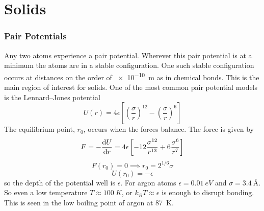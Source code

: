 %
%
%
%
%
%
    
    \part{Solids}
    \section{Pair Potentials}
    Any two atoms experience a pair potential.
    Wherever this pair potential is at a minimum the atoms are in a stable configuration.
    One such stable configuration occurs at distances on the order of \SI{e-10}{m} as in chemical bonds.
    This is the main region of interest for solids.
    One of the most common pair potential models is the Lennard--Jones potential
    \[U(r) = 4\epsilon\left[\left(\frac{\sigma}{r}\right)^{12} - \left(\frac{\sigma}{r}\right)^6\right]\]
    The equilibrium point, \(r_0\), occurs when the forces balance.
    The force is given by
    \[F = -\dv{U}{r} = 4\epsilon\left[-12\frac{\sigma^{12}}{r^{13}} + 6\frac{\sigma^6}{r^7}\right]\]
    \[F(r_0) = 0 \implies r_0 = 2^{1/6}\sigma\]
    \[U(r_0) = -\epsilon\]
    so the depth of the potential well is \(\epsilon\).
    For argon atoms \(\epsilon = \SI{0.01}{eV}\) and \(\sigma = \SI{3.4}{\angstrom}\).
    So even a low temperature \(T\approx\SI{100}{K}\), or \(k_BT\approx\epsilon\) is enough to disrupt bonding.
    This is seen in the low boiling point of argon at \SI{87}{K}.
    
